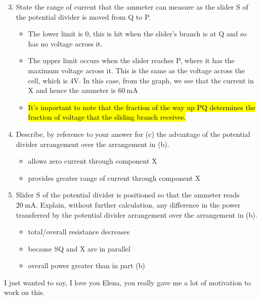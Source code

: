 \documentclass[a4paper,12pt]{article}
\begin{document}
\begin{enumerate}[label=(\alph*)]
  \setcounter{enumi}{2}
  \item State the range of current that the ammeter can measure as the slider S of the potential divider is moved from Q to P.
        \begin{itemize}
          \item The lower limit is 0, this is hit when the slider's branch is at Q and so has no voltage across it.
          \item The upper limit occurs when the slider reaches P, where it has the maximum voltage across it. This is the same as the voltage across the cell, which is 4V. In this case, from the graph, we see that the current in X and hence the ammeter is $\SI{60}{\m\A}$
          \item \hl{It's important to note that the fraction of the way up PQ determines the fraction of voltage that the sliding branch receives.}
        \end{itemize}
  \item Describe, by reference to your answer for (c) the advantage of the potential divider arrangement over the arrangement in (b).
        \begin{itemize}
          \item allows zero current through component X
          \item provides greater range of current through component X
        \end{itemize}
  \item Slider S of the potential divider is positioned so that the ammeter reads $\SI{20}{\m\A}$. Explain, without further calculation, any difference in the power transferred by the potential divider arrangement over the arrangement in (b).
        \begin{itemize}
          \item total/overall resistance decreases
          \item because SQ and X are in parallel
          \item overall power greater than in part (b)
        \end{itemize}
\end{enumerate}

I just wanted to say, I love you Elena, you really gave me a lot of motivation to work on this.
\end{document}
